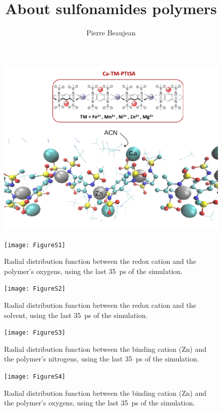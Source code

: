\documentclass[12pt,a4paper]{article}
\title{About sulfonamides polymers}
\author{Pierre Beaujean}
\begin{document}
	
	\maketitle
	
	\begin{figure}[!h]
		\centering
		\includegraphics[width=\linewidth]{structure}
	\end{figure}
	
\begin{figure}[!h]
	\centering
	\texttt{[image: FigureS1]}
	\caption{Radial distribution function between the redox cation and the polymer's oxygens, using the last \SI{35}{\pico\second} of the simulation.}
\end{figure}

\begin{figure}[!h]
	\centering
	\texttt{[image: FigureS2]}
	\caption{Radial distribution function between the redox cation and the solvent, using the last \SI{35}{\pico\second} of the simulation.}
\end{figure}

\begin{figure}[!h]
	\centering
\texttt{[image: FigureS3]}
\caption{Radial distribution function between the binding cation (Zn) and the polymer's nitrogens, using the last \SI{35}{\pico\second} of the simulation.}
\end{figure}

\begin{figure}[!h]
\centering
\texttt{[image: FigureS4]}
\caption{Radial distribution function between the binding cation (Zn) and the polymer's oxygens, using the last \SI{35}{\pico\second} of the simulation.}
\end{figure}
\end{document}
